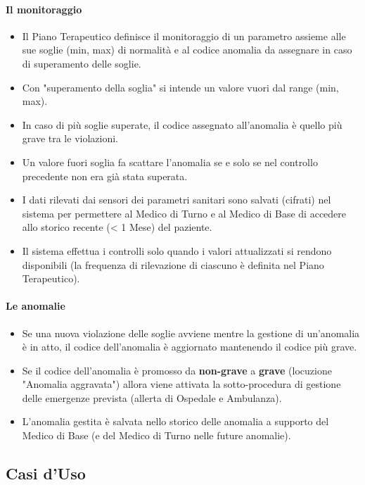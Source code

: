 \documentclass[a4paper,11pt,oneside, table]{article}
\begin{document}
\paragraph{Il monitoraggio}
\begin{itemize}
  \item Il Piano Terapeutico definisce il monitoraggio di un parametro assieme alle sue soglie (min, max) di normalit\`a e al codice anomalia da assegnare in caso di superamento delle soglie.
  \item Con "superamento della soglia" si intende un valore vuori dal range (min, max).
  \item In caso di pi\`u soglie superate, il codice assegnato all'anomalia \`e quello pi\`u grave tra le violazioni.
  \item Un valore fuori soglia fa scattare l'anomalia se e solo se nel controllo precedente non era gi\`a stata superata.
  \item I dati rilevati dai sensori dei parametri sanitari sono salvati (cifrati) nel sistema per permettere al Medico di Turno e al Medico di Base di accedere allo storico recente (< 1 Mese) del paziente.
  \item Il sistema effettua i controlli solo quando i valori attualizzati si rendono disponibili (la frequenza di rilevazione di ciascuno \`e definita nel Piano Terapeutico).
\end{itemize}

\paragraph{Le anomalie}
\begin{itemize}
  \item Se una nuova violazione delle soglie avviene mentre la gestione di un'anomalia \`e in atto, il codice dell'anomalia \`e aggiornato mantenendo il codice pi\`u grave.
  \item Se il codice dell'anomalia \`e promosso da \textbf{non-grave} a \textbf{grave} (locuzione "Anomalia aggravata") allora viene attivata la sotto-procedura di gestione delle emergenze prevista (allerta di Ospedale e Ambulanza).
  \item L'anomalia gestita \`e salvata nello storico delle anomalia a supporto del Medico di Base (e del Medico di Turno nelle future anomalie).
\end{itemize}

\subsection{Casi d'Uso}
\end{document}
